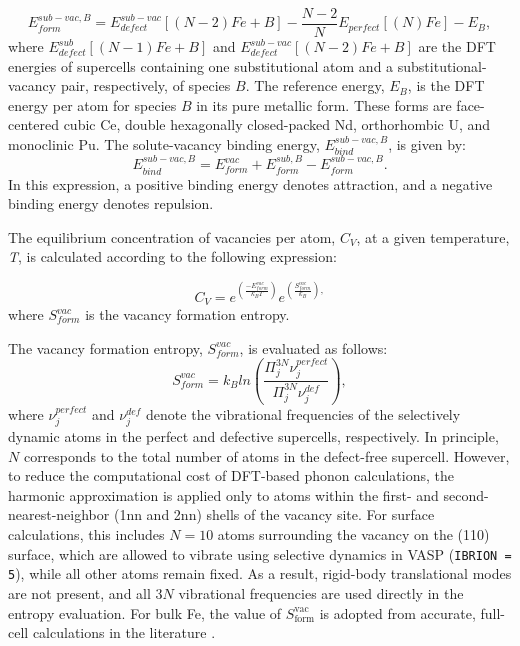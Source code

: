 \documentclass[preprint,12pt]{elsarticle}
\begin{document}
\begin{equation}
\label{eq_Ef_vac_sub}
    E_{form}^{sub-vac,B} = E_{defect}^{sub-vac}[(N-2)Fe + B] - \frac{N-2}{N}E_{perfect}[(N) Fe] - E_{B},
\end{equation}
where $E_{defect}^{sub}[(N-1)Fe + B]$ and $E_{defect}^{sub-vac}[(N-2)Fe + B]$ are the DFT energies of supercells containing one substitutional atom and a substitutional-vacancy pair, respectively, of species $B$. The reference energy, $E_{B}$, is the DFT energy per atom for species $B$ in its pure metallic form. These forms are face-centered cubic Ce, double hexagonally closed-packed Nd, orthorhombic U, and monoclinic Pu. The solute-vacancy binding energy, $E_{bind}^{sub-vac,B}$, is given by:
\begin{equation}
\label{eq_Eb}
    E_{bind}^{sub-vac,B} = E_{form}^{vac} + E_{form}^{sub,B} - E_{form}^{sub-vac,B}.
\end{equation}
In this expression, a positive binding energy denotes attraction, and a negative binding energy denotes repulsion. 

The equilibrium concentration of vacancies per atom, $C_V$, at a given temperature, \textit{T}, is calculated according to the following expression:

\begin{equation}
\label{eq:conc_vac}
    C_V = e^{(\frac{-E_{form}^{vac}}{k_B T})} e^{(\frac{S_{form}^{vac}}{k_B}),}
\end{equation}
where $S_{form}^{vac}$ is the vacancy formation entropy. 

The vacancy formation entropy, $S_{form}^{vac}$, is evaluated as follows:
\begin{equation}
    S_{form}^{vac} = k_B ln\left(\frac{\Pi^{3N}_j \nu_j^{perfect}}{\Pi^{3N}_j \nu_j^{def}}\right),
\label{eq_entropy}
\end{equation}
where $\nu_j^{perfect}$ and $\nu_j^{def}$ denote the vibrational frequencies of the selectively dynamic atoms in the perfect and defective supercells, respectively. In principle, $N$ corresponds to the total number of atoms in the defect-free supercell. However, to reduce the computational cost of DFT-based phonon calculations, the harmonic approximation is applied only to atoms within the first- and second-nearest-neighbor (1nn and 2nn) shells of the vacancy site. For surface calculations, this includes $N = 10$ atoms surrounding the vacancy on the (110) surface, which are allowed to vibrate using selective dynamics in VASP (\texttt{IBRION = 5}), while all other atoms remain fixed. As a result, rigid-body translational modes are not present, and all $3N$ vibrational frequencies are used directly in the entropy evaluation. For bulk Fe, the value of $S_{\text{form}}^{\text{vac}}$ is adopted from accurate, full-cell calculations in the literature \cite{messina_systematic_2016}.
\end{document}

